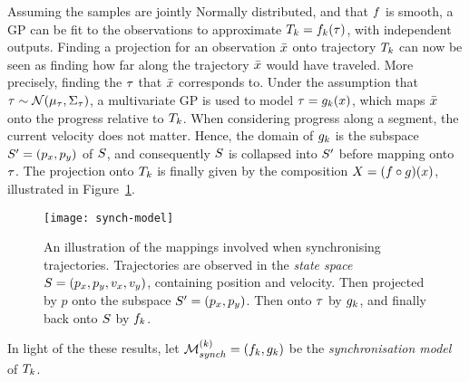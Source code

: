 Assuming the samples are jointly Normally distributed, and
that $f$ is smooth, a GP can be fit to the
observations to approximate $T_{k} = f_{k}(\tau)$, with
independent outputs. Finding a projection for an observation $\bar{x}$ onto trajectory
$T_{k}$ can now be seen as finding how far along the trajectory $\bar{x}$
would have traveled. More precisely, finding the $\tau$ that $\bar{x}$
corresponds to. Under the assumption that $\tau \sim
\mathcal{N}(\mu_{\tau}, \Sigma_{\tau})$, a multivariate
GP is used to model $\tau = g_{k}(x)$, which maps $\bar{x}$ onto the
progress relative to $T_{k}$. When considering progress along a
segment, the current velocity does not matter. Hence, the domain of
$g_{k}$ is the subspace $S' = (p_x, p_y)$ of $S$, and
consequently $S$ is collapsed into $S'$ before
mapping onto $\tau$. The projection onto $T_{k}$ is
finally given by the composition $X = (f \circ
g)(x)$, illustrated in Figure~\ref{fig:synch-model}.
\begin{figure}
  \centering
  \texttt{[image: synch-model]}
  \caption{An illustration of the mappings involved when synchronising
    trajectories. Trajectories are observed in the \textit{state space} $S =
(p_x, p_y, v_x, v_y)$, containing position and velocity. Then projected by $p$ onto the
    subspace $S' = (p_x, p_y)$. Then onto
    $\tau$ by $g_{k}$, and finally back onto $S$ by
    $f_{k}$.}\label{fig:synch-model}
\end{figure}
In light of the these results, let $\mathcal{M}_{synch}^{(k)} = (f_{k},
g_{k})$ be the \textit{synchronisation model} of $T_{k}$.

